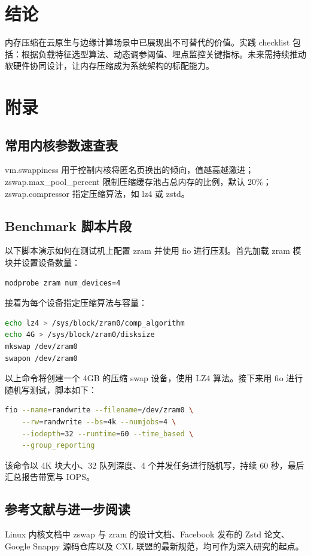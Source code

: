 \chapter{结论}
内存压缩在云原生与边缘计算场景中已展现出不可替代的价值。实践 checklist 包括：根据负载特征选型算法、动态调参阈值、埋点监控关键指标。未来需持续推动软硬件协同设计，让内存压缩成为系统架构的标配能力。\par
\chapter{附录}
\section{常用内核参数速查表}
vm.swappiness 用于控制内核将匿名页换出的倾向，值越高越激进；zswap.max\_{}pool\_{}percent 限制压缩缓存池占总内存的比例，默认 20\%{}；zswap.compressor 指定压缩算法，如 lz4 或 zstd。\par
\section{Benchmark 脚本片段}
以下脚本演示如何在测试机上配置 zram 并使用 fio 进行压测。首先加载 zram 模块并设置设备数量：\par
\begin{lstlisting}[language=bash]
modprobe zram num_devices=4
\end{lstlisting}
接着为每个设备指定压缩算法与容量：\par
\begin{lstlisting}[language=bash]
echo lz4 > /sys/block/zram0/comp_algorithm
echo 4G > /sys/block/zram0/disksize
mkswap /dev/zram0
swapon /dev/zram0
\end{lstlisting}
以上命令将创建一个 4GB 的压缩 swap 设备，使用 LZ4 算法。接下来用 fio 进行随机写测试，脚本如下：\par
\begin{lstlisting}[language=bash]
fio --name=randwrite --filename=/dev/zram0 \
    --rw=randwrite --bs=4k --numjobs=4 \
    --iodepth=32 --runtime=60 --time_based \
    --group_reporting
\end{lstlisting}
该命令以 4K 块大小、32 队列深度、4 个并发任务进行随机写，持续 60 秒，最后汇总报告带宽与 IOPS。\par
\section{参考文献与进一步阅读}
Linux 内核文档中 zswap 与 zram 的设计文档、Facebook 发布的 Zstd 论文、Google Snappy 源码仓库以及 CXL 联盟的最新规范，均可作为深入研究的起点。\par
